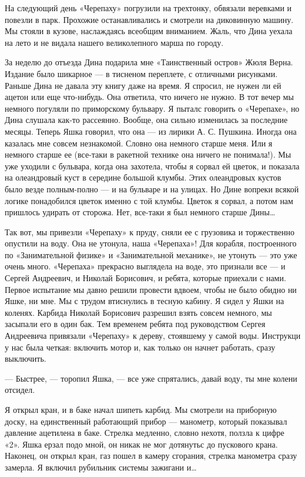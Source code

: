 На следующий день «Черепаху» погрузили на трехтонку, обвязали веревками  и
повезли в парк. Прохожие останавливались и смотрели на диковинную  машину.
Мы стояли в кузове, наслаждаясь всеобщим вниманием. Жаль, что Дина  уехала
на лето и не видала нашего великолепного марша по городу.

За неделю до отъезда Дина  подарила мне «Таинственный остров» Жюля  Верна.
Издание было  шикарное  — в  тисненом  переплете, с  отличными  рисунками.
Раньше Дина не давала эту книгу даже  на время. Я спросил, не нужен ли  ей
ацетон или еще что-нибудь. Она ответила, что ничего не нужно. В тот  вечер
мы  немного  погуляли  по  приморскому  бульвару.  Я  пыталс  говорить   о
«Черепахе»,  но  Дина  слушала   как-то  рассеянно.  Вообще,  она   сильно
изменилась за последние месяцы. Теперь Яшка  говорил, что она — из  лирики
А. С.  Пушкина. Иногда  она  казалась мне  совсем незнакомой.  Словно  она
немного старше меня. Или я немного старше ее (все-таки в ракетной  технике
она ничего не понимала!). Мы уже  уходили с бульвара, когда она  захотела,
чтобы я  сорвал ей  цветок,  и показала  на  олеандровый куст  в  середине
большой клумбы. Этих  олеандровых кустов  было везде полным-полно  — и  на
бульваре и на  улицах. Но  Дине вопреки всякой  логике понадобился  цветок
именно с той  клумбы. Цветок  я сорвал, а  потом нам  пришлось удирать  от
сторожа. Нет, все-таки я был немного старше Дины…

Так  вот,  мы  привезли  «Черепаху»  к  пруду,  сняли  ее  с  грузовика  и
торжественно опустили  на  воду.  Она не  утонула,  наша  «Черепаха»!  Для
корабля,  построенного   по   «Занимательной  физике»   и   «Занимательной
механике»,  не  утонуть  —  это  уже  очень  много.  «Черепаха»  прекрасно
выглядела на  воде, это  признали  все —  и  Сергей Андреевич,  и  Николай
Борисович, и ребята, которые  приехали с нами.  Первое испытание мы  давно
решили провести вдвоем, чтобы не было обидно ни Яшке, ни мне. Мы с  трудом
втиснулись в тесную  кабину. Я сидел  у Яшки на  коленях. Карбида  Николай
Борисович разрешил взять совсем немного, мы  засыпали его в один бак.  Тем
временем ребята под руководством Сергея Андреевича привязали «Черепаху»  к
дереву, стоявшему  у самой  воды. Инструкци  у нас  была четкая:  включить
мотор и, как только он начнет работать, сразу выключить.

— Быстрее, — торопил Яшка, — все уже спрятались, давай воду, ты мне колени
отсидел.

Я открыл кран,  и в  баке начал шипеть  карбид. Мы  смотрели на  приборную
доску, на  единственный работающий  прибор —  манометр, который  показывал
давление ацетилена в баке. Стрелка медленно, словно нехотя, ползла к цифре
«2». Яшка ерзал подо мной, он  никак не мог дотянутьс до пускового  крана.
Наконец, он открыл кран,  газ пошел в  камеру сгорания, стрелка  манометра
сразу замерла. Я включил рубильник системы зажигани и…


